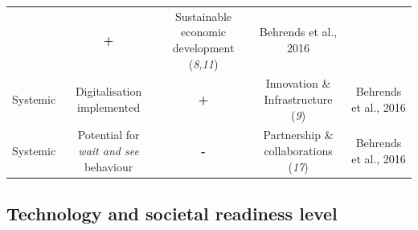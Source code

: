 \documentclass[
]{book}
\begin{document}
\begin{longtable}[]{@{}ccccc@{}}
\begin{minipage}[t]{0.16\columnwidth}
\end{minipage} & \begin{minipage}[t]{0.17\columnwidth}\centering
\textbf{+}\strut
\end{minipage} & \begin{minipage}[t]{0.17\columnwidth}\centering
Sustainable economic development (\emph{8,11})\strut
\end{minipage} & \begin{minipage}[t]{0.17\columnwidth}\centering
Behrends et al., 2016\strut
\end{minipage}\tabularnewline
\begin{minipage}[t]{0.17\columnwidth}\centering
Systemic\strut
\end{minipage} & \begin{minipage}[t]{0.16\columnwidth}\centering
Digitalisation implemented\strut
\end{minipage} & \begin{minipage}[t]{0.17\columnwidth}\centering
\textbf{+}\strut
\end{minipage} & \begin{minipage}[t]{0.17\columnwidth}\centering
Innovation \& Infrastructure (\emph{9})\strut
\end{minipage} & \begin{minipage}[t]{0.17\columnwidth}\centering
Behrends et al., 2016\strut
\end{minipage}\tabularnewline
\begin{minipage}[t]{0.17\columnwidth}\centering
Systemic\strut
\end{minipage} & \begin{minipage}[t]{0.16\columnwidth}\centering
Potential for \emph{wait and see} behaviour\strut
\end{minipage} & \begin{minipage}[t]{0.17\columnwidth}\centering
\textbf{-}\strut
\end{minipage} & \begin{minipage}[t]{0.17\columnwidth}\centering
Partnership \& collaborations (\emph{17})\strut
\end{minipage} & \begin{minipage}[t]{0.17\columnwidth}\centering
Behrends et al., 2016\strut
\end{minipage}\tabularnewline
\bottomrule
\end{longtable}

\hypertarget{technology-and-societal-readiness-level-26}{%
\subsection*{Technology and societal readiness level}\label{technology-and-societal-readiness-level-26}}
\end{document}
